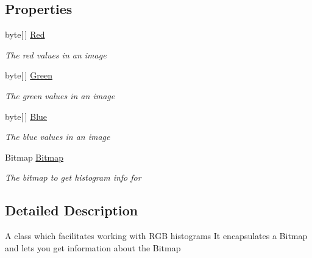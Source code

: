 \subsection*{Properties}
\begin{DoxyCompactItemize}
\item 
byte\mbox{[}$\,$\mbox{]} \hyperlink{class_proto_test_1_1_golem_1_1_web_driver_1_1_elements_1_1_images_1_1_histogram_a1526e0e844601560be71b8f186ccaf08}{Red}
\begin{DoxyCompactList}\small\item\em The red values in an image \end{DoxyCompactList}\item 
byte\mbox{[}$\,$\mbox{]} \hyperlink{class_proto_test_1_1_golem_1_1_web_driver_1_1_elements_1_1_images_1_1_histogram_a585d3b0381034e08dc6192eb332ae13d}{Green}
\begin{DoxyCompactList}\small\item\em The green values in an image \end{DoxyCompactList}\item 
byte\mbox{[}$\,$\mbox{]} \hyperlink{class_proto_test_1_1_golem_1_1_web_driver_1_1_elements_1_1_images_1_1_histogram_a3a8e951ec47a138a008416f73d957eae}{Blue}
\begin{DoxyCompactList}\small\item\em The blue values in an image \end{DoxyCompactList}\item 
Bitmap \hyperlink{class_proto_test_1_1_golem_1_1_web_driver_1_1_elements_1_1_images_1_1_histogram_af986fdc664c75a0de3285a9ab81cd558}{Bitmap}
\begin{DoxyCompactList}\small\item\em The bitmap to get histogram info for \end{DoxyCompactList}\end{DoxyCompactItemize}


\subsection{Detailed Description}
A class which facilitates working with R\-G\-B histograms It encapsulates a Bitmap and lets you get information about the Bitmap 



